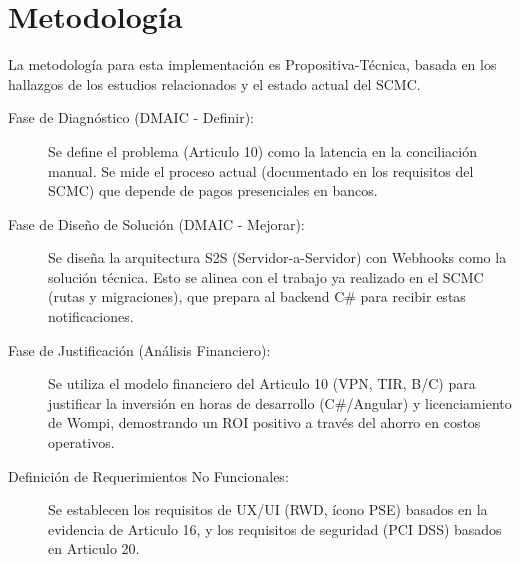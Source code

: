 \section{Metodología}
La metodología para esta implementación es Propositiva-Técnica, basada en los hallazgos de los estudios relacionados y el estado actual del SCMC.

\begin{description}
    \item[Fase de Diagnóstico (DMAIC - Definir):] Se define el problema (Articulo 10) como la latencia en la conciliación manual. Se mide el proceso actual (documentado en los requisitos del SCMC) que depende de pagos presenciales en bancos.
    
    \item[Fase de Diseño de Solución (DMAIC - Mejorar):] Se diseña la arquitectura S2S (Servidor-a-Servidor) con Webhooks como la solución técnica. Esto se alinea con el trabajo ya realizado en el SCMC (rutas y migraciones), que prepara al backend C\# para recibir estas notificaciones.
    
    \item[Fase de Justificación (Análisis Financiero):] Se utiliza el modelo financiero del Articulo 10 (VPN, TIR, B/C) para justificar la inversión en horas de desarrollo (C\#/Angular) y licenciamiento de Wompi, demostrando un ROI positivo a través del ahorro en costos operativos.
    
    \item[Definición de Requerimientos No Funcionales:] Se establecen los requisitos de UX/UI (RWD, ícono PSE) basados en la evidencia de Articulo 16, y los requisitos de seguridad (PCI DSS) basados en Articulo 20.
\end{description}   